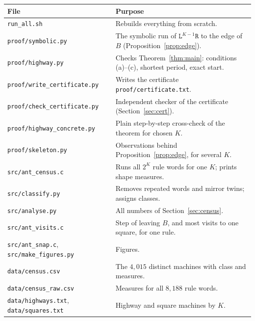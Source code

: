 \documentclass[11pt,a4paper]{article}
\theoremstyle{definition}
\theoremstyle{remark}
\newcommand{\Lw}{\mathtt{L}}
\newcommand{\Rw}{\mathtt{R}}
\begin{document}
\begin{center}
\small
\begin{tabular}{@{}lp{8.6cm}@{}}
\toprule
File & Purpose\\
\midrule
\texttt{run\_all.sh} & Rebuilds everything from scratch.\\
\texttt{proof/symbolic.py} & The symbolic run of $\Lw^{K-1}\Rw$ to the edge of $B$ (Proposition~\ref{prop:edge}).\\
\texttt{proof/highway.py} & Checks Theorem~\ref{thm:main}: conditions (a)--(c), shortest period, exact start.\\
\texttt{proof/write\_certificate.py} & Writes the certificate \texttt{proof/certificate.txt}.\\
\texttt{proof/check\_certificate.py} & Independent checker of the certificate (Section~\ref{sec:cert}).\\
\texttt{proof/highway\_concrete.py} & Plain step-by-step cross-check of the theorem for chosen $K$.\\
\texttt{proof/skeleton.py} & Observations behind Proposition~\ref{prop:edge}, for several $K$.\\
\texttt{src/ant\_census.c} & Runs all $2^K$ rule words for one $K$; prints shape measures.\\
\texttt{src/classify.py} & Removes repeated words and mirror twins; assigns classes.\\
\texttt{src/analyse.py} & All numbers of Section~\ref{sec:census}.\\
\texttt{src/ant\_visits.c} & Step of leaving $B$, and most visits to one square, for one rule.\\
\texttt{src/ant\_snap.c}, \texttt{src/make\_figures.py} & Figures.\\
\texttt{data/census.csv} & The $4{,}015$ distinct machines with class and measures.\\
\texttt{data/census\_raw.csv} & Measures for all $8{,}188$ rule words.\\
\texttt{data/highways.txt}, \texttt{data/squares.txt} & Highway and square machines by $K$.\\
\bottomrule
\end{tabular}
\end{center}
\end{document}

